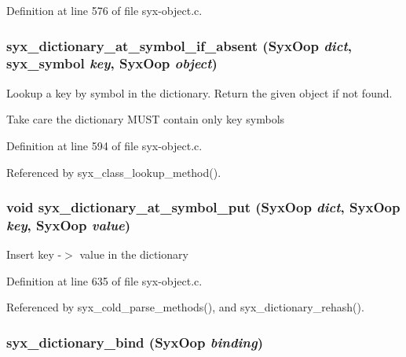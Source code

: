 Definition at line 576 of file syx-object.c.\hypertarget{syx-object_8c_df9287e8b1edc74ddd6a66b9c8f2118e}{
\subsubsection{ syx\_\-dictionary\_\-at\_\-symbol\_\-if\_\-absent ({\bf SyxOop} {\em dict}, \/  {\bf syx\_\-symbol} {\em key}, \/  {\bf SyxOop} {\em object})}}
\label{syx-object_8c_df9287e8b1edc74ddd6a66b9c8f2118e}


Lookup a key by symbol in the dictionary. Return the given object if not found.

Take care the dictionary MUST contain only key symbols 

Definition at line 594 of file syx-object.c.

Referenced by syx\_\-class\_\-lookup\_\-method().\hypertarget{syx-object_8c_85b96f493bbd81bea0f40968a3972e80}{
\subsubsection{\setlength{\rightskip}{0pt plus 5cm}void syx\_\-dictionary\_\-at\_\-symbol\_\-put ({\bf SyxOop} {\em dict}, \/  {\bf SyxOop} {\em key}, \/  {\bf SyxOop} {\em value})}}
\label{syx-object_8c_85b96f493bbd81bea0f40968a3972e80}


Insert key -$>$ value in the dictionary 

Definition at line 635 of file syx-object.c.

Referenced by syx\_\-cold\_\-parse\_\-methods(), and syx\_\-dictionary\_\-rehash().\hypertarget{syx-object_8c_a81f27a1ea91fc341ccee4224b4fef1c}{
\subsubsection{ syx\_\-dictionary\_\-bind ({\bf SyxOop} {\em binding})}}
\label{syx-object_8c_a81f27a1ea91fc341ccee4224b4fef1c}


